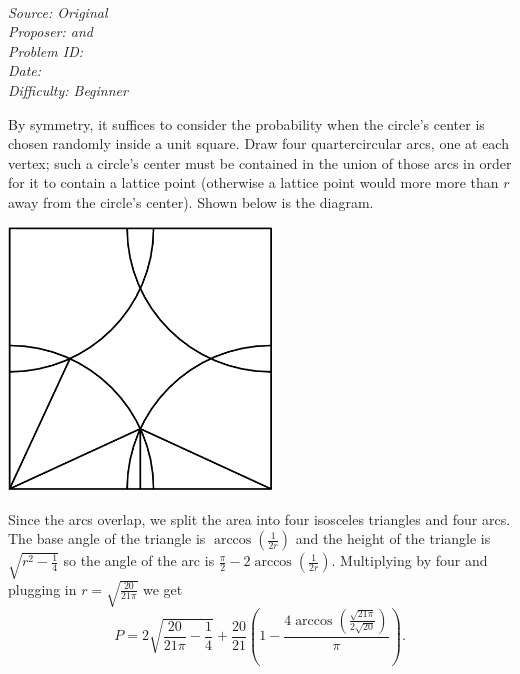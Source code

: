\SSbreak\\
\emph{Source: Original}\\
\emph{Proposer: \Ptan and \Pwen}\\
\emph{Problem ID:}\\
\emph{Date: }\\
\emph{Difficulty: Beginner}\\
\SSbreak

\bigskip

\begin{solution}\hfil\medskip
  
    By symmetry, it suffices to consider the probability when the circle's center is chosen randomly inside a unit square. Draw four quartercircular arcs,
    one at each vertex; such a circle's center must be contained in the union of those arcs in order for it to contain a lattice point (otherwise a lattice point
    would more more than $r$ away from the circle's center). Shown below is the diagram.

    \begin{center}
        \includegraphics[width=7cm,height=7cm]{Sections/Files/11-2-1-img.png}
    \end{center}

    Since the arcs overlap, we split the area into four isosceles triangles and four arcs. The base angle of the triangle is $\arccos\left(\frac{1}{2r}\right)$
    and the height of the triangle is $\sqrt{r^2 - \frac{1}{4}}$ so the angle of the arc is $\frac{\pi}{2} - 2 \arccos\left(\frac{1}{2r}\right).$ Multiplying by
    four and plugging in $r = \sqrt{\frac{20}{21\pi}}$ we get
    $$P = \boxed{2 \sqrt{\dfrac{20}{21\pi} - \dfrac{1}{4}} + \dfrac{20}{21}\left(1 - \dfrac{4 \arccos\left(\frac{\sqrt{21 \pi}}{2\sqrt{20}}\right)}{\pi}\right)}.$$
\end{solution}\bigskip